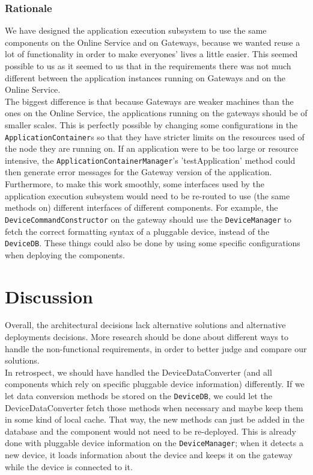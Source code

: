         \subsubsection*{Rationale}
            We have designed the application execution subsystem to use the same components on the Online Service and on Gateways,
            because we wanted reuse a lot of functionality in order to make everyones' lives a little easier. This seemed possible to us
            as it seemed to us that in the requirements there was not much different between the application instances running on Gateways
            and on the Online Service. \\
            The biggest difference is that because Gateways are weaker machines than the ones on the Online Service, the applications
            running on the gateways should be of smaller scales. This is perfectly possible by changing some configurations in the
            \texttt{ApplicationContainer}s so that they have stricter limits on the resources used of the node they are running on.
            If an application were to be too large or resource intensive, the \texttt{ApplicationContainerManager}'s 'testApplication' method
            could then generate error messages for the Gateway version of the application.\\
            Furthermore, to make this work smoothly, some interfaces used by the application execution subsystem would need to be
            re-routed to use (the same methods on) different interfaces of different components. For example, the \texttt{DeviceCommandConstructor}
            on the gateway should use the \texttt{DeviceManager} to fetch the correct formatting syntax of a pluggable device, instead of the \texttt{DeviceDB}.
            These things could also be done by using some specific configurations when deploying the components.

\section{Discussion}
    Overall, the architectural decisions lack alternative solutions and alternative deployments decisions.
    More research should be done about different ways to handle the
    non-functional requirements, in order to better judge and compare our solutions.\\

    In retrospect, we should have handled the DeviceDataConverter (and all components which rely on specific pluggable device information) differently.
    If we let data conversion methods be stored on the \texttt{DeviceDB}, we could let the DeviceDataConverter fetch those methods when necessary and maybe
    keep them in some kind of local cache. That way, the new methods can just be added in the database and the component would not need to be re-deployed.
    This is already done with pluggable device information on the \texttt{DeviceManager}; when it detects a new device, it loads information about the device
    and keeps it on the gateway while the device is connected to it.\\

